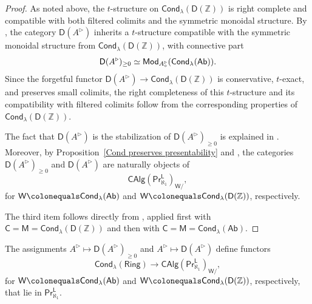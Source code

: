 \begin{proof}
    As noted above, the $t$-structure on $\mathsf{Cond}_\lambda(\mathsf{D}(\mathbb{Z}))$ is right complete and compatible with both filtered colimits and the symmetric monoidal structure. By \cite[Prop.~A.15]{CartierCyclotomic}, the category $\mathsf{D}(A^\triangleright)$ inherits a $t$-structure compatible with the symmetric monoidal structure from $\mathsf{Cond}_\lambda(\mathsf{D}(\mathbb{Z}))$, with connective part
\[\mathsf{D}(A^\triangleright)_{\geq0}\simeq \mathsf{Mod}_{A^\triangleright_\circ}\mleft(\mathsf{Cond}_\lambda(\mathsf{Ab})\mright).\]
Since the forgetful functor $\mathsf{D}(A^\triangleright)\to\mathsf{Cond}_\lambda(\mathsf{D}(\mathbb{Z}))$ is conservative, $t$-exact, and preserves small colimits, the right completeness of this $t$-structure and its compatibility with filtered colimits follow from the corresponding properties of $\mathsf{Cond}_\lambda(\mathsf{D}(\mathbb{Z}))$.
    
The fact that $\mathsf{D}(A^\triangleright)$ is the stabilization of $\mathsf{D}(A^\triangleright)_{\geq0}$ is explained in \cite[Rem.~C.3.1.5]{lurie2018spectral}. Moreover, by Proposition~\ref{Cond preserves presentability} and \cite[Lem.~2.2]{aoki2025higherpresentablecategorieslimits}, the categories $\mathsf{D}(A^\triangleright)_{\geq0}$ and $\mathsf{D}(A^\triangleright)$ are naturally objects of
\[\mathsf{CAlg}(\mathsf{Pr}^\mathsf{L}_{\aleph_1})_{\mathsf{W}/},\]
for $\mathsf{W}\colonequals \mathsf{Cond}_\lambda(\mathsf{Ab})$ and $\mathsf{W}\colonequals \mathsf{Cond}_\lambda(\mathsf{D}(\mathbb{Z}))$, respectively.

The third item follows directly from \cite[Prop.~4.6.2.17]{higheralgebra}, applied first with $\mathsf{C}=\mathsf{M}=\mathsf{Cond}_\lambda(\mathsf{D}(\mathbb{Z}))$ and then with $\mathsf{C}=\mathsf{M}=\mathsf{Cond}_\lambda(\mathsf{Ab})$.
\end{proof}

\begin{proposition}\label{D is a map in Pr_k}
   The assignments $A^\triangleright\mapsto \mathsf{D}(A^\triangleright)_{\geq0}$ and $A^\triangleright\mapsto\mathsf{D}(A^\triangleright)$ define functors
    \[\mathsf{Cond}_\lambda(\mathsf{Ring})\to \mathsf{CAlg}(\mathsf{Pr}^\mathsf{L}_{\aleph_1})_{\mathsf{W}/},\]
    for $\mathsf{W}\colonequals \mathsf{Cond}_\lambda(\mathsf{Ab})$ and $\mathsf{W}\colonequals \mathsf{Cond}_\lambda(\mathsf{D}(\mathbb{Z}))$, respectively, that lie in $\mathsf{Pr}^\mathsf{L}_{\aleph_1}$.
\end{proposition}

